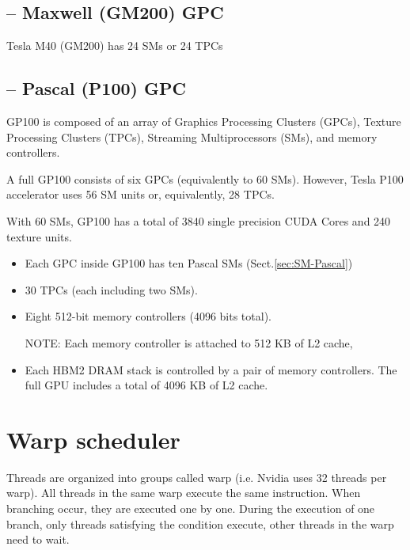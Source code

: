 \subsection{-- Maxwell (GM200) GPC}
\label{sec:GPC-Maxwell}

Tesla M40 (GM200) has 24 SMs or 24 TPCs

\subsection{-- Pascal (P100) GPC}
\label{sec:GPC-Pascal}

GP100 is composed of an array of Graphics Processing Clusters (GPCs), Texture
Processing Clusters (TPCs), Streaming Multiprocessors (SMs), and memory
controllers.


A full GP100 consists of six GPCs (equivalently to 60 SMs). However,
Tesla P100 accelerator uses 56 SM units or, equivalently, 28 TPCs.

With 60 SMs, GP100 has a total of 3840 single precision CUDA Cores and 240
texture units.

\begin{itemize}

  \item Each GPC inside GP100 has ten Pascal SMs (Sect.\ref{sec:SM-Pascal})
  
  \item 30 TPCs (each including two SMs).
  
  
  \item Eight 512-bit memory controllers (4096 bits total). 

  NOTE: Each memory controller is attached to 512 KB of L2 cache, 

  \item Each HBM2 DRAM stack is controlled by a pair of memory controllers. The
  full GPU includes a total of 4096 KB of L2 cache.

\end{itemize}



\section{Warp scheduler}
\label{sec:warp-scheduler}

Threads are organized into groups called warp (i.e. Nvidia uses 32 threads per
warp). All threads in the same warp execute the same instruction. When branching
occur, they are executed one by one. During the execution of one branch, only
threads satisfying the condition execute, other threads in the warp need to
wait. 

